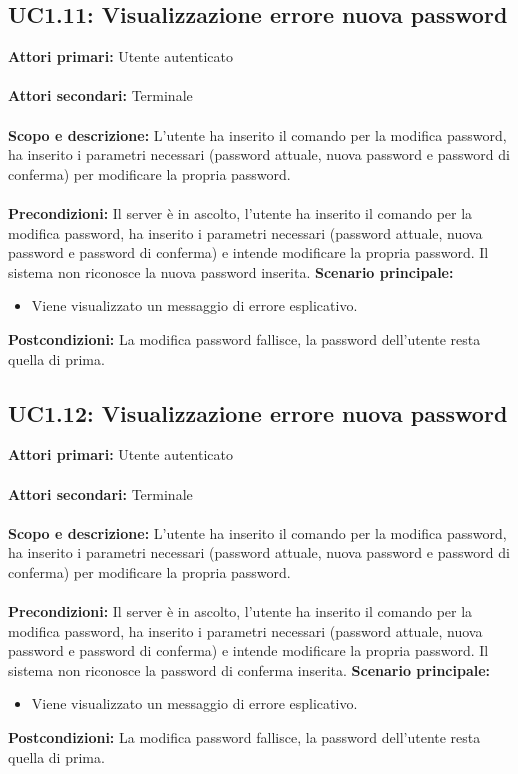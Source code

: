 \documentclass{scalatekids-article}
\begin{document}
\subsection{UC1.11: Visualizzazione errore nuova password}

\textbf{Attori primari:} Utente autenticato\\ \\
\textbf{Attori secondari:} Terminale\\ \\
\textbf{Scopo e descrizione:}
L'utente ha inserito il comando per la modifica password, ha inserito i parametri necessari (password attuale, nuova password e password di conferma) per modificare la propria password.\\ \\
\textbf{Precondizioni:} Il server è in ascolto, l'utente ha inserito il comando per la modifica password, ha inserito i parametri necessari (password attuale, nuova password e password di conferma) e intende modificare la propria password. Il sistema non riconosce la nuova password inserita.
\textbf{Scenario principale:}
\begin{itemize}
  \item Viene visualizzato un messaggio di errore esplicativo.
\end{itemize}
\textbf{Postcondizioni:} La modifica password fallisce, la password dell'utente resta quella di prima.

\subsection{UC1.12: Visualizzazione errore nuova password}

\textbf{Attori primari:} Utente autenticato\\ \\
\textbf{Attori secondari:} Terminale\\ \\
\textbf{Scopo e descrizione:}
L'utente ha inserito il comando per la modifica password, ha inserito i parametri necessari (password attuale, nuova password e password di conferma) per modificare la propria password.\\ \\
\textbf{Precondizioni:} Il server è in ascolto, l'utente ha inserito il comando per la modifica password, ha inserito i parametri necessari (password attuale, nuova password e password di conferma) e intende modificare la propria password. Il sistema non riconosce la password di conferma inserita.
\textbf{Scenario principale:}
\begin{itemize}
  \item Viene visualizzato un messaggio di errore esplicativo.
\end{itemize}
\textbf{Postcondizioni:} La modifica password fallisce, la password dell'utente resta quella di prima.
\end{document}
